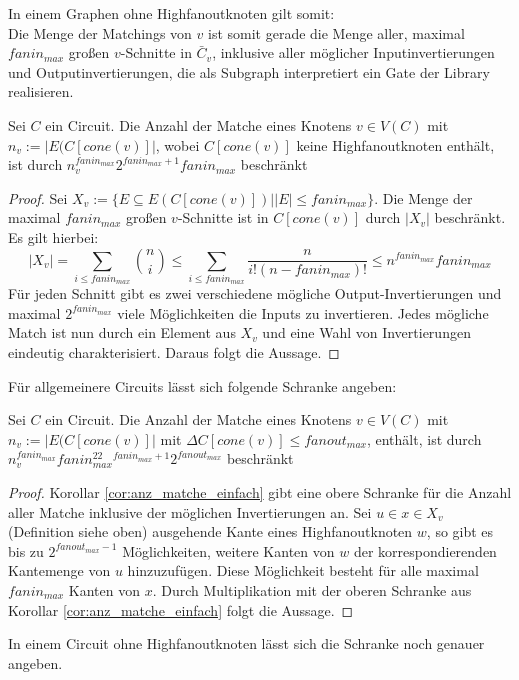 \documentclass[11pt, a4paper, german]{article}
\begin{document}
In einem Graphen ohne Highfanoutknoten gilt somit: \\
Die Menge der Matchings von $v$ ist somit gerade die Menge aller, maximal $fanin_{max}$ großen $v$-Schnitte in $\bar{C}_v$, inklusive aller möglicher Inputinvertierungen und Outputinvertierungen, die als Subgraph interpretiert ein Gate der Library realisieren.
\begin{cor}\label{cor:anz_matche_einfach}
Sei $C$ ein Circuit. Die Anzahl der Matche eines Knotens $v\in V(C)$ mit $n_v := |E(C[cone(v)]|$, wobei $C[cone(v)]$ keine Highfanoutknoten enthält, ist durch $n_v^{fanin_{max}} 2^{fanin_{max}+1} fanin_{max}$ beschränkt
\end{cor}
\begin{proof}
Sei  $X_v:= \{ E \subseteq E(C[cone(v)]) | |E|\leq fanin_{max}  \}$. Die Menge der maximal $fanin_{max}$ großen $v$-Schnitte ist in $C[cone(v)]$ durch $ |X_v|$ beschränkt. Es gilt hierbei:
\[ |X_v| = \sum\limits_{i \leq fanin_{max}} \binom{n}{i} \leq  \sum\limits_{i \leq fanin_{max}}\frac{n}{i!(n-fanin_{max})!} \leq n^{fanin_{max}} fanin_{max} \]
Für jeden Schnitt gibt es zwei verschiedene mögliche Output-Invertierungen und maximal  $2^{fanin_{max}}$ viele Möglichkeiten die Inputs zu invertieren. Jedes mögliche Match ist nun durch ein Element aus $X_v$ und eine Wahl von Invertierungen eindeutig charakterisiert. Daraus folgt die Aussage.
\end{proof}
Für allgemeinere Circuits lässt sich folgende Schranke angeben: 
\begin{cor}\label{cor:anzahl_matche_bel}
Sei $C$ ein Circuit. Die Anzahl der Matche eines Knotens $v\in V(C)$ mit $n_v := |E(C[cone(v)]|$ mit $\Delta C[cone(v)] \leq fanout_{max}$, enthält, ist durch $n_v^{fanin_{max}} fanin_{max}^22^{fanin_{max}+1}2^{fanout_{max}}$ beschränkt
\end{cor}
\begin{proof}
Korollar \ref{cor:anz_matche_einfach} gibt eine obere Schranke für die Anzahl aller Matche inklusive der möglichen Invertierungen an. Sei $u \in x \in X_v$ (Definition siehe oben) ausgehende Kante eines Highfanoutknoten $w$, so gibt es bis zu $2^{fanout_{max}-1}$ Möglichkeiten, weitere Kanten von $w$ der korrespondierenden Kantemenge von $u$ hinzuzufügen.  Diese Möglichkeit besteht für alle maximal $fanin_{max}$ Kanten von $x$. Durch Multiplikation mit der oberen Schranke aus Korollar \ref{cor:anz_matche_einfach} folgt die Aussage.
\end{proof}
In einem Circuit ohne Highfanoutknoten lässt sich die Schranke noch genauer angeben. 
\end{document}
